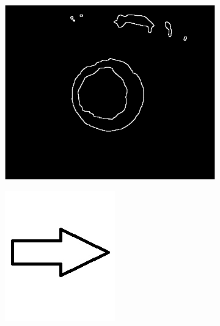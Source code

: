 \documentclass{article}
\begin{document}
\begin{figure}[H]
\begin{subfigure}{.35\textwidth}
  \centering
  \includegraphics[width=0.97\linewidth]{_Figures/raw_data_3_sobel_algo.png}
  \caption{}
  \label{fig:raw_3}
\end{subfigure}%
\begin{subfigure}{.09\textwidth}
  \centering
  \includegraphics[width=0.97\linewidth]{_Figures/leftrightarrow.jpg}

\end{subfigure}
\end{figure}
\end{document}
